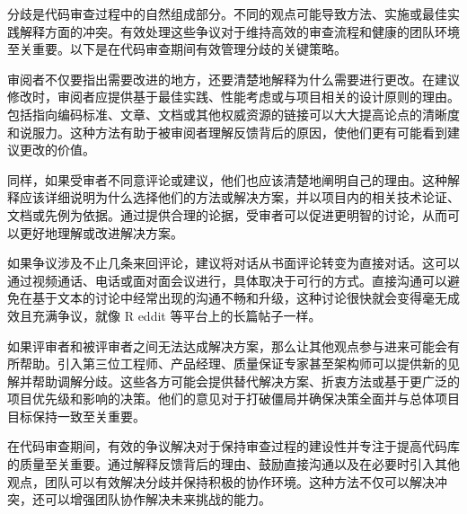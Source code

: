 
分歧是代码审查过程中的自然组成部分。不同的观点可能导致方法、实施或最佳实践解释方面的冲突。有效处理这些争议对于维持高效的审查流程和健康的团队环境至关重要。以下是在代码审查期间有效管理分歧的关键策略。


审阅者不仅要指出需要改进的地方，还要清楚地解释为什么需要进行更改。在建议修改时，审阅者应提供基于最佳实践、性能考虑或与项目相关的设计原则的理由。包括指向编码标准、文章、文档或其他权威资源的链接可以大大提高论点的清晰度和说服力。这种方法有助于被审阅者理解反馈背后的原因，使他们更有可能看到建议更改的价值。


同样，如果受审者不同意评论或建议，他们也应该清楚地阐明自己的理由。这种解释应该详细说明为什么选择他们的方法或解决方案，并以项目内的相关技术论证、文档或先例为依据。通过提供合理的论据，受审者可以促进更明智的讨论，从而可以更好地理解或改进解决方案。


如果争议涉及不止几条来回评论，建议将对话从书面评论转变为直接对话。这可以通过视频通话、电话或面对面会议进行，具体取决于可行的方式。直接沟通可以避免在基于文本的讨论中经常出现的沟通不畅和升级，这种讨论很快就会变得毫无成效且充满争议，就像 R eddit 等平台上的长篇帖子一样。


如果评审者和被评审者之间无法达成解决方案，那么让其他观点参与进来可能会有所帮助。引入第三位工程师、产品经理、质量保证专家甚至架构师可以提供新的见解并帮助调解分歧。这些各方可能会提供替代解决方案、折衷方法或基于更广泛的项目优先级和影响的决策。他们的意见对于打破僵局并确保决策全面并与总体项目目标保持一致至关重要。

在代码审查期间，有效的争议解决对于保持审查过程的建设性并专注于提高代码库的质量至关重要。通过解释反馈背后的理由、鼓励直接沟通以及在必要时引入其他观点，团队可以有效解决分歧并保持积极的协作环境。这种方法不仅可以解决冲突，还可以增强团队协作解决未来挑战的能力。

